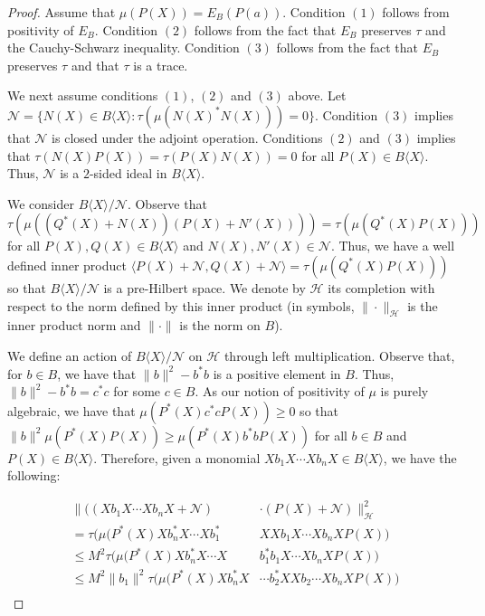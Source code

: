 \documentclass[11pt]{amsart}
\begin{document}
\begin{proof}
Assume that $\mu(P(X)) = E_{B}(P(a))$.  Condition $(1)$ follows from positivity of $E_{B}$.  Condition $(2)$ follows from the fact that $E_{B}$ preserves $\tau$ and
the Cauchy-Schwarz inequality.  Condition $(3)$ follows from the fact that $E_{B}$ preserves $\tau$ and that $\tau$ is a trace.

We next assume conditions $(1)$, $(2)$ and $(3)$ above.  Let $\mathcal{N} = \{N(X) \in B\langle X \rangle : \tau(\mu(N(X)^{\ast}N(X))) = 0 \}$.
Condition $(3)$ implies that $\mathcal{N}$ is closed under the adjoint operation.  Conditions $(2)$ and $(3)$ implies that $\tau(N(X)P(X)) = \tau(P(X)N(X)) = 0$ for all
$P(X) \in B\langle X \rangle$.  Thus, $\mathcal{N}$ is a $2$-sided ideal in $B\langle X \rangle$.

We consider $B\langle X \rangle / \mathcal{N}$.  Observe that $\tau(\mu((Q^{\ast}(X) + N(X))(P(X) + N'(X)))) = \tau(\mu(Q^{\ast}(X)P(X))) $ for all
$P(X),Q(X) \in B\langle X \rangle$ and $N(X) , N'(X) \in \mathcal{N}$.  Thus, we have a well defined inner product 
$\langle P(X) + \mathcal{N}, Q(X) + \mathcal{N} \rangle = \tau(\mu(Q^{\ast}(X) P(X)))$ so that $B\langle X \rangle / \mathcal{N}$ is a pre-Hilbert space.
We denote by $\mathcal{H}$ its completion with respect to the norm defined by this inner product (in symbols, $\| \cdot \|_{\mathcal{H}}$ is the inner product norm
and $\| \cdot \|$ is the norm on $B$).

We define an action of $B\langle X \rangle / \mathcal{N}$ on $\mathcal{H}$ through left multiplication.  Observe that, for $b\in B$, we have
that $\|b \|^{2} - b^{\ast}b$ is a positive element in $B$.  Thus, $\|b \|^{2} - b^{\ast}b = c^{\ast}c$ for some $c\in B$.  As our notion of positivity of $\mu$
is purely algebraic, we have that $\mu(P^{\ast}(X)c^{\ast}cP(X)) \geq 0$ so that $\|b\|^{2} \mu(P^{\ast}(X)P(X)) \geq \mu(P^{\ast}(X)b^{\ast}bP(X))$ for all $b\in B$
and $P(X) \in B\langle X \rangle$.  Therefore, given a monomial $Xb_{1}X \cdots Xb_{n}X \in B\langle X \rangle$, we have the following:

\begin{align*}
\| ( (Xb_{1}X \cdots Xb_{n}X + \mathcal{N}) & \cdot (P(X) + \mathcal{N}) \|_{\mathcal{H}}^{2} \\
    =\tau(\mu(P^{\ast}(X) Xb_{n}^{\ast}X \cdots Xb_{1}^{\ast} & XX b_{1}X \cdots Xb_{n}X P(X))  \\
  \leq 
M^{2} \tau(\mu(P^{\ast}(X) Xb_{n}^{\ast}X \cdots  X & b_{1}^{\ast} b_{1}X \cdots Xb_{n}X P(X))  \\
 \leq 
M^{2} \|b_{1} \|^{2} \tau(\mu(P^{\ast}(X) Xb_{n}^{\ast}X & \cdots b_{2}^{\ast}XX b_{2}\cdots Xb_{n}X P(X))  \\
\end{align*}


\end{proof}
\end{document}
